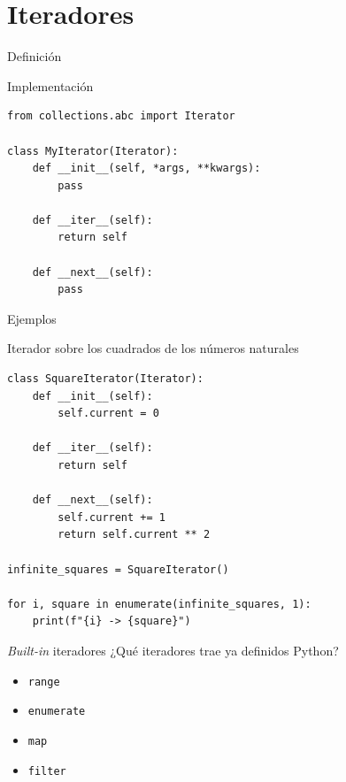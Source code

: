 \documentclass[12pt]{beamer}
\begin{document}
\section{Iteradores}
\begin{frame}[fragile]{Definición}
\begin{block}{Implementación}
\begin{verbatim}
from collections.abc import Iterator

class MyIterator(Iterator):
    def __init__(self, *args, **kwargs):
        pass

    def __iter__(self):
        return self

    def __next__(self):
        pass
\end{verbatim}
\end{block}   
\end{frame}

\begin{frame}[fragile]{Ejemplos}
\begin{block}{Iterador sobre los cuadrados de los números naturales}
\begin{verbatim}
class SquareIterator(Iterator):
    def __init__(self):
        self.current = 0

    def __iter__(self):
        return self

    def __next__(self):
        self.current += 1
        return self.current ** 2

infinite_squares = SquareIterator()

for i, square in enumerate(infinite_squares, 1):
    print(f"{i} -> {square}")
\end{verbatim}
\end{block}   
\end{frame}

\begin{frame}[fragile]{\textit{Built-in} iteradores}
¿Qué iteradores trae ya definidos Python?
\begin{itemize}
    \item \texttt{range}
    \item \texttt{enumerate}
    \item \texttt{map}
    \item \texttt{filter}
\end{itemize}
\end{frame}
\end{document}

